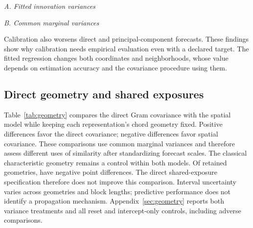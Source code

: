 \documentclass[11pt]{article}
\begin{document}
\begin{table}[htbp]
  \centering\footnotesize\setlength{\tabcolsep}{4pt}
  \textit{A. Fitted innovation variances}\par\smallskip
  
  \par\medskip
  \textit{B. Common marginal variances}\par\smallskip
  
  \caption{Calibration and covariance specification. Differences compare
    calibrated with native distance for each model on common outcomes, using
    matched-neighbor bandwidths. Positive differences favor calibration.
    Panel A fits innovation variances separately by procedure; panel B rescales
    full forecasts to common marginal variances. Brackets give conditional 95\%
    stationary-bootstrap intervals with 21- and 63-day expected blocks.
    Appendix~\ref{sec:empirical-supplement} also reports direct-benchmark
  contrasts.}\label{tab:variance-contrasts}
\end{table}

Calibration also worsens direct and principal-component forecasts.
These findings
show why calibration needs empirical evaluation even with a declared target.
The fitted regression changes both coordinates and neighborhoods, whose value
depends on estimation accuracy and the covariance procedure using them.

\subsection{Direct geometry and shared exposures}
Table~\ref{tab:geometry} compares the direct Gram covariance with the spatial
model while keeping each representation's chord geometry fixed. Positive
differences favor the direct covariance; negative differences favor spatial
covariance. These comparisons use common marginal variances and therefore
assess different uses of similarity after standardizing forecast scales.
The classical characteristic geometry remains a control within both models.
Of \GramComparisons{} retained geometries, \GramNegative{} have negative point
differences. The direct shared-exposure specification therefore does not improve
this comparison. Interval uncertainty varies across geometries and block
lengths; predictive performance does not identify a propagation mechanism.
Appendix~\ref{sec:geometry} reports both variance treatments and all reset and
intercept-only controls, including adverse comparisons.

\begin{table}[htbp]
  \centering\footnotesize\setlength{\tabcolsep}{4pt}
  
  \caption{Direct Gram minus spatial log scores on common marginal variances,
    2020--2025. Native and decoded columns use identical unit-chord geometry
    within each contrast. Brackets give conditional 95\% stationary-bootstrap
    intervals with expected blocks of 21 dates; the appendix also reports
    63-date intervals and full-covariance scores. Decoded exposures are
    normalized specifically for this comparison. The joint row uses the
  average characteristic Gram matrix.}\label{tab:geometry}
\end{table}
\end{document}
